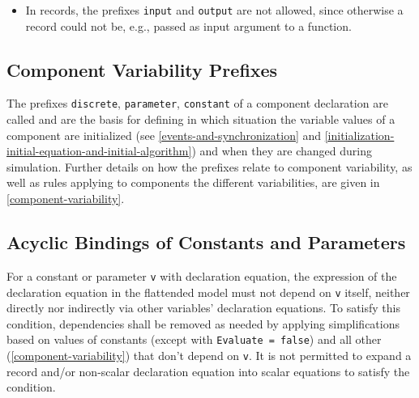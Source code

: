 \begin{itemize}
  There is the restriction that connectors which have at least one variable declared as \lstinline!input! must be externally connected, see \cref{balanced-models} (in order to get a locally balanced model, where the number of local unknowns is identical to the number of unknown equations).
  Together with the block diagram semantics rule this means, that such connectors must be connected \emph{exactly once externally}.
\item
  In records, the prefixes \lstinline!input! and \lstinline!output! are not allowed, since otherwise a record could not be, e.g., passed as input argument to a function.
\end{itemize}


\subsection{Component Variability Prefixes}\label{component-variability-prefixes-discrete-parameter-constant}

The prefixes \lstinline!discrete!, \lstinline!parameter!, \lstinline!constant! of a component declaration are called  and are the basis for defining in which situation the variable values of a component are initialized (see \cref{events-and-synchronization} and \cref{initialization-initial-equation-and-initial-algorithm}) and when they are changed during simulation.
Further details on how the prefixes relate to component variability, as well as rules applying to components the different variabilities, are given in \cref{component-variability}.


\subsection{Acyclic Bindings of Constants and Parameters}\label{acyclic-bindings-of-constants-and-parameters}

For a constant or parameter \lstinline!v! with declaration equation, the expression of the declaration equation in the flattended model must not depend on \lstinline!v! itself, neither directly nor indirectly via other variables' declaration equations.
To satisfy this condition, dependencies shall be removed as needed by applying simplifications based on values of constants (except with \lstinline!Evaluate = false!) and all other  (\cref{component-variability}) that don't depend on \lstinline!v!.
It is not permitted to expand a record and/or non-scalar declaration equation into scalar equations to satisfy the condition.

